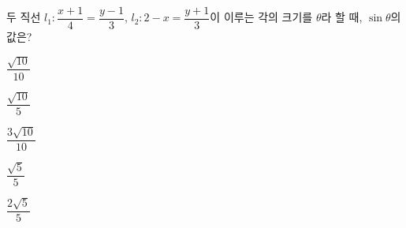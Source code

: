 두 직선 $l_1\colon \dfrac{x+1}{4}=\dfrac{y-1}{3}$, $l_2\colon 2-x=\dfrac{y+1}{3}$이 이루는 각의 크기를 $\theta$라 할 때, $\sin\theta$의 값은?
\begin{choices32}{\rule[-3ex]{0pt}{8ex}$\dfrac{\sqrt{10}}{10}$}{\rule[-3ex]{0pt}{8ex}$\dfrac{\sqrt{10}}{5}$}{\rule[-3ex]{0pt}{8ex}$\dfrac{3\sqrt{10}}{10}$}{\rule[-3ex]{0pt}{8ex}$\dfrac{\sqrt{5}}{5}$}{\rule[-3ex]{0pt}{8ex}$\dfrac{2\sqrt{5}}{5}$}\end{choices32}
